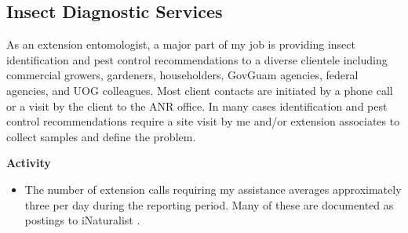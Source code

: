 \documentclass[12pt,english]{scrartcl}
\begin{document}
\subsection{Insect Diagnostic Services}
\begin{refsection}

As an extension entomologist, a major part of my job is providing
insect identification and pest control recommendations to a diverse
clientele including commercial growers, gardeners, householders, GovGuam
agencies, federal agencies, and UOG colleagues. Most client contacts
are initiated by a phone call or a visit by the client to the ANR
office. In many cases identification and pest control recommendations
require a site visit by me and/or extension associates to collect
samples and define the problem.

\raggedright\vspace{2mm}\textbf{Activity}
\begin{itemize}
\item The number of extension calls requiring my assistance averages approximately
three per day during the reporting period. Many of these are documented
as postings to iNaturalist \cite{moore_inaturalist_2018}.
\end{itemize}

\printbibliography[]
\end{refsection}
\end{document}
